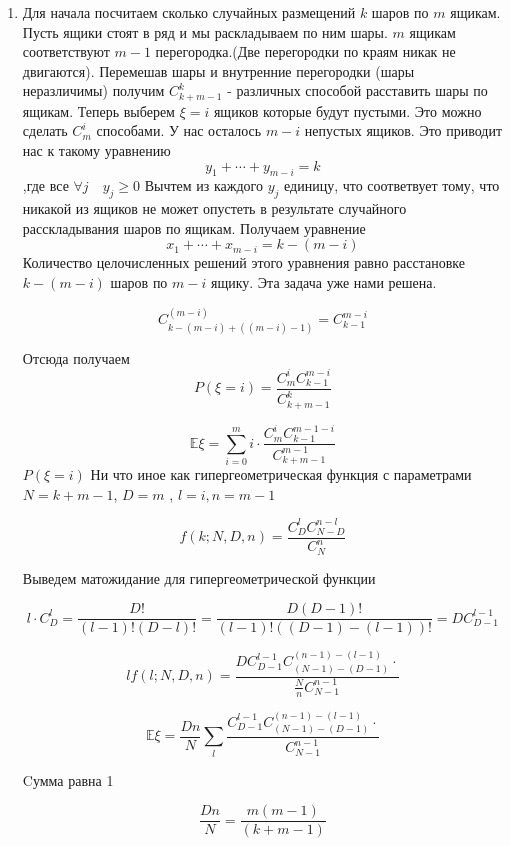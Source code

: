 \begin{solution}
	\begin{enumerate}
		\item 
		Для начала посчитаем сколько случайных размещений $ k $ шаров по $ m $ ящикам.
		Пусть ящики стоят в ряд и мы раскладываем по ним шары. $ m $ ящикам соответствуют $ m-1 $ перегородка.(Две перегородки по краям никак не двигаются). Перемешав шары и внутренние перегородки (шары неразличимы) получим $ \displaystyle 
		C_{k+m-1}^{k}$ - различных способой расставить шары по ящикам.
		 Теперь выберем $ \xi = i $ ящиков которые будут пустыми.
		 Это можно сделать $ \displaystyle C^{i}_{m} $ способами.
		 У нас осталось $ m - i  $ непустых ящиков. Это приводит нас к такому уравнению
		 $$
		 y_{1}+\cdots+y_{m-i}=k
		 $$
		 ,где все $ \forall j \quad y_{j} \ge 0 $
		  Вычтем из каждого $ y_{j} $ единицу, что соответвует тому, что никакой из ящиков не может опустеть в результате случайного расскладывания шаров по ящикам. Получаем уравнение
		  $$ 
		  x_{1}+\cdots+x_{m-i} = k - (m - i)
		  $$
		  Количество целочисленных решений этого уравнения равно расстановке $ k - (m -i) $ шаров по $ m - i $  ящику.
		  Эта задача уже нами решена.
		  
		  $$ C^{(m -i)}_{k - (m -i) + ((m -i)-1) } = C^{m-i}_{k-1}$$
		  
		  Отсюда получаем $$ P(\xi = i) = \frac{C_{m}^{i} C^{m-i}_{k-1}}{C_{k+m-1}^{k}}$$
		  
		  $$
		  \mathbb{E} \xi = \sum_{i=0}^{m} i \cdot \frac{C_{m}^{i} C^{m-1-i}_{k-1}}{C_{k+m-1}^{m-1}} 
		  $$
		  $
		  P(\xi=i)
		  $ Ни что иное как гипергеометрическая функция с параметрами $ N = k + m -1 $, $ D = m $ , $ l = i , n = m -1  $
		  
	$$
	f(k ; N, D, n) = 
	\frac{C_{D}^{l} C_{N-D}^{n-l}}{C_{N}^{n}}
	$$
	
	Выведем матожидание для гипергеометрической функции
	
	$$ 
		l \cdot C^{l}_{D} = \frac{D !}{(l-1) !(D-l) !}=\frac{D(D-1) !}{(l-1) !((D-1)-(l-1)) !} = D C^{l-1}_{D-1}
	$$
	
	$$
		l f(l ; N, D, n) =  \frac{D C^{l-1}_{D-1} C_{(N-1)-(D-1)}^{(n-1)-(l-1)}\cdot}{\frac{N}{n} C^{n-1}_{N-1}}
	$$
	
	$$	 
	\mathbb{E} \xi = \frac{Dn}{N} \sum_{l} 
	\frac{ C^{l-1}_{D-1} C_{(N-1)-(D-1)}^{(n-1)-(l-1)}\cdot}{C^{n-1}_{N-1}}
	$$	
	
	Cумма равна 1
	
	$$ \frac{Dn}{N}=\frac{m(m-1)}{(k+m-1)} $$
	 
	\end{enumerate}
\end{solution}	
